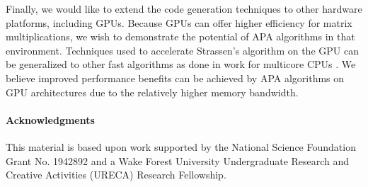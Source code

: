 \documentclass[manuscript]{acmart}
\begin{document}
Finally, we would like to extend the code generation techniques to other hardware platforms, including GPUs.
Because GPUs can offer higher efficiency for matrix multiplications, we wish to demonstrate the potential of APA algorithms in that environment.
Techniques used to accelerate Strassen's algorithm on the GPU \cite{HYvdG20,LAES13} can be generalized to other fast algorithms as done in work for multicore CPUs \cite{BB15,HRMvdG17}.
We believe improved performance benefits can be achieved by APA algorithms on GPU architectures due to the relatively higher memory bandwidth.



\paragraph*{Acknowledgments}

This material is based upon work supported by the National Science Foundation Grant No. 1942892 and a Wake Forest University Undergraduate Research and Creative Activities (URECA) Research Fellowship.


\balance


\end{document}
